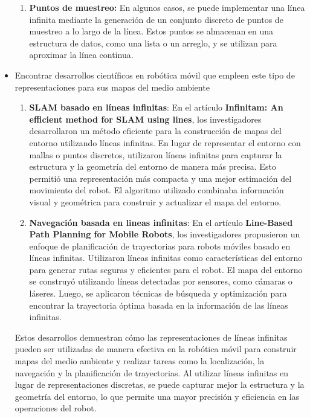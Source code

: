 \documentclass{article}
\begin{document}
\begin{itemize}
\begin{enumerate}
  \item \textbf{Puntos de muestreo:} En algunos casos, se puede implementar una línea infinita mediante la generación de un conjunto discreto de puntos de muestreo a lo largo de la línea. Estos puntos se almacenan en una estructura de datos, como una lista o un arreglo, y se utilizan para aproximar la línea continua.
    
  \end{enumerate}
  
  
\item{Encontrar desarrollos científicos en robótica móvil que empleen este tipo de representaciones para sus mapas del medio ambiente}

  \begin{enumerate}
  \item \textbf{SLAM basado en líneas infinitas}: En el artículo \textbf{Infinitam: An efficient method for SLAM using lines}, los investigadores desarrollaron un método eficiente para la construcción de mapas del entorno utilizando líneas infinitas. En lugar de representar el entorno con mallas o puntos discretos, utilizaron líneas infinitas para capturar la estructura y la geometría del entorno de manera más precisa. Esto permitió una representación más compacta y una mejor estimación del movimiento del robot. El algoritmo utilizado combinaba información visual y geométrica para construir y actualizar el mapa del entorno.
  \item \textbf{Navegación basada en lineas infinitas}: En el artículo \textbf{Line-Based Path Planning for Mobile Robots}, los investigadores propusieron un enfoque de planificación de trayectorias para robots móviles basado en líneas infinitas. Utilizaron líneas infinitas como características del entorno para generar rutas seguras y eficientes para el robot. El mapa del entorno se construyó utilizando líneas detectadas por sensores, como cámaras o láseres. Luego, se aplicaron técnicas de búsqueda y optimización para encontrar la trayectoria óptima basada en la información de las líneas infinitas.
  \end{enumerate}

  Estos desarrollos demuestran cómo las representaciones de líneas infinitas pueden ser utilizadas de manera efectiva en la robótica móvil para construir mapas del medio ambiente y realizar tareas como la localización, la navegación y la planificación de trayectorias. Al utilizar líneas infinitas en lugar de representaciones discretas, se puede capturar mejor la estructura y la geometría del entorno, lo que permite una mayor precisión y eficiencia en las operaciones del robot.


\end{itemize}
\end{document}
